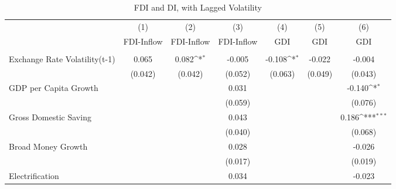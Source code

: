 \begin{table}[H] \def\sym#1{\ifmmode^{#1}\else\(^{#1}\)\fi} \caption{FDI and DI, with Lagged Volatility} \begin{adjustbox}{max width=\textwidth} \begin{tabular}{l*{6}{c}} \\ \hline\hline
            &\multicolumn{1}{c}{(1)}&\multicolumn{1}{c}{(2)}&\multicolumn{1}{c}{(3)}&\multicolumn{1}{c}{(4)}&\multicolumn{1}{c}{(5)}&\multicolumn{1}{c}{(6)}\\
            &\multicolumn{1}{c}{FDI-Inflow}&\multicolumn{1}{c}{FDI-Inflow}&\multicolumn{1}{c}{FDI-Inflow}&\multicolumn{1}{c}{GDI}&\multicolumn{1}{c}{GDI}&\multicolumn{1}{c}{GDI}\\
\hline \addlinespace \multicolumn{6}{l}{} \\  \addlinespace[2pt]
Exchange Rate Volatility(t-1)&       0.065         &       0.082\sym{*}  &      -0.005         &      -0.108\sym{*}  &      -0.022         &      -0.004         \\
            &     (0.042)         &     (0.042)         &     (0.052)         &     (0.063)         &     (0.049)         &     (0.043)         \\
\addlinespace
GDP per Capita Growth&                     &                     &       0.031         &                     &                     &      -0.140\sym{*}  \\
            &                     &                     &     (0.059)         &                     &                     &     (0.076)         \\
\addlinespace
Gross Domestic Saving&                     &                     &       0.043         &                     &                     &       0.186\sym{***}\\
            &                     &                     &     (0.040)         &                     &                     &     (0.068)         \\
\addlinespace
Broad Money Growth&                     &                     &       0.028         &                     &                     &      -0.026         \\
            &                     &                     &     (0.017)         &                     &                     &     (0.019)         \\
\addlinespace
Electrification&                     &                     &       0.034         &                     &                     &      -0.023         \\

\end{tabular}
\end{adjustbox}
\end{table}

